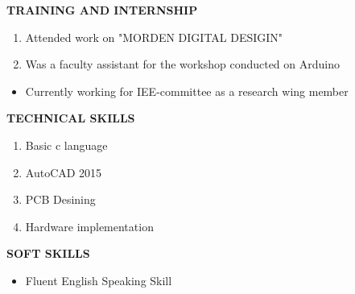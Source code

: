 \documentclass[a4paper]{article}
\begin{document}
\begin{flushleft}
\textbf {TRAINING AND INTERNSHIP}\\
\begin{enumerate}
\item Attended work on "MORDEN DIGITAL DESIGIN" 
\item Was a faculty assistant for the workshop conducted on Arduino
\end{enumerate}
\end{flushleft}


\begin{flushleft}
\textbf {}
\begin{itemize}
\item Currently working for IEE-committee as a research wing member
\end{itemize}
\end{flushleft}

\begin{flushleft}
\textbf {TECHNICAL SKILLS}\\
\begin{enumerate}
\item Basic c language
\item AutoCAD 2015
\item PCB Desining
\item Hardware implementation
\end{enumerate}
\end{flushleft}

\begin{flushleft}
\textbf {SOFT SKILLS}\\
\begin{itemize}
\item  Fluent English Speaking Skill

\end{itemize}
\end{flushleft}
\end{document}
